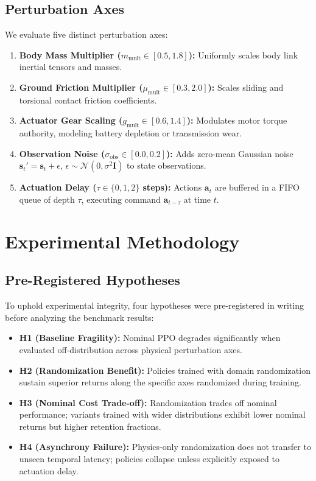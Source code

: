 \documentclass[conference]{IEEEtran}
\begin{document}
\subsection{Perturbation Axes}
We evaluate five distinct perturbation axes:
\begin{enumerate}
    \item \textbf{Body Mass Multiplier ($m_{\text{mult}} \in [0.5, 1.8]$):} Uniformly scales body link inertial tensors and masses.
    \item \textbf{Ground Friction Multiplier ($\mu_{\text{mult}} \in [0.3, 2.0]$):} Scales sliding and torsional contact friction coefficients.
    \item \textbf{Actuator Gear Scaling ($g_{\text{mult}} \in [0.6, 1.4]$):} Modulates motor torque authority, modeling battery depletion or transmission wear.
    \item \textbf{Observation Noise ($\sigma_{\text{obs}} \in [0.0, 0.2]$):} Adds zero-mean Gaussian noise $\mathbf{s}_t' = \mathbf{s}_t + \epsilon$, $\epsilon \sim \mathcal{N}(0, \sigma^2 \mathbf{I})$ to state observations.
    \item \textbf{Actuation Delay ($\tau \in \{0, 1, 2\}$ steps):} Actions $\mathbf{a}_t$ are buffered in a FIFO queue of depth $\tau$, executing command $\mathbf{a}_{t-\tau}$ at time $t$.
\end{enumerate}

\section{Experimental Methodology}

\subsection{Pre-Registered Hypotheses}
To uphold experimental integrity, four hypotheses were pre-registered in writing before analyzing the benchmark results:
\begin{itemize}
    \item \textbf{H1 (Baseline Fragility):} Nominal PPO degrades significantly when evaluated off-distribution across physical perturbation axes.
    \item \textbf{H2 (Randomization Benefit):} Policies trained with domain randomization sustain superior returns along the specific axes randomized during training.
    \item \textbf{H3 (Nominal Cost Trade-off):} Randomization trades off nominal performance; variants trained with wider distributions exhibit lower nominal returns but higher retention fractions.
    \item \textbf{H4 (Asynchrony Failure):} Physics-only randomization does not transfer to unseen temporal latency; policies collapse unless explicitly exposed to actuation delay.
\end{itemize}
\end{document}
